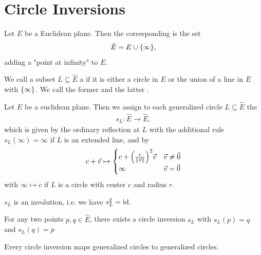 \section{Circle Inversions}
\begin{definition}
	Let $E$ be a Euclidean plane. Then the corresponding  is the set
	\begin{align*}
		\hat E = E \cup \qty{\infty},
	\end{align*}
	adding a "point at infinity" to $E$.
\end{definition}
\begin{definition}
	We call a subset $L \subseteq \hat E$ a  if it is either a circle in $E$ or the union of a line in $E$ with $\qty{\infty}$. We call the former  and the latter .
\end{definition}
\begin{definition}
	Let $E$ be a euclidean plane. Then we assign to each generalized circle $L \subseteq \hat E$ the 
	\begin{align*}
		s_L : \hat E \to \hat E,
	\end{align*}
	which is given by the ordinary reflection at $L$ with the additional rule $s_L(\infty) = \infty$ if $L$ is an extended line, and by
	\begin{align*}
		c + \vec{v} \mapsto
		\begin{cases} 
			c + \qty(\frac{r}{\norm{\vec{v}}})^2 \vec{v} & \vec{v} \neq \kern-1.2pt\vec{\kern1.2pt 0}\\
			\infty &\vec{v} = \kern-1.2pt\vec{\kern1.2pt 0}
		\end{cases}
	\end{align*}
	with $\infty \mapsto c$ if $L$ is a circle with center $c$ and radius $r$.
\end{definition}
\begin{exercise}
	$s_L$ is an involution, i.e. we have $s_L^2 = \operatorname{id}$.
\end{exercise}
\begin{exercise}
	For any two points $p,q \in \hat E$, there exists a circle inversion $s_L$ with $s_L(p) = q$ and $s_L(q) = p$
\end{exercise}
\begin{exercise}
	Every circle inversion maps generalized circles to generalized circles.
\end{exercise}

\pagebreak
